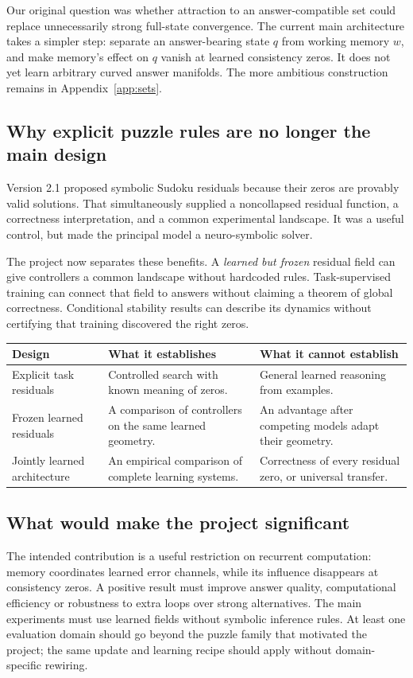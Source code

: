 \documentclass[11pt,a4paper]{article}
\begin{document}
Our original question was whether attraction to an answer-compatible set could replace unnecessarily strong full-state convergence. The current main architecture takes a simpler step: separate an answer-bearing state $q$ from working memory $w$, and make memory's effect on $q$ vanish at learned consistency zeros. It does not yet learn arbitrary curved answer manifolds. The more ambitious construction remains in Appendix~\ref{app:sets}.

\subsection{Why explicit puzzle rules are no longer the main design}
Version 2.1 proposed symbolic Sudoku residuals because their zeros are provably valid solutions. That simultaneously supplied a noncollapsed residual function, a correctness interpretation, and a common experimental landscape. It was a useful control, but made the principal model a neuro-symbolic solver.

The project now separates these benefits. A \emph{learned but frozen} residual field can give controllers a common landscape without hardcoded rules. Task-supervised training can connect that field to answers without claiming a theorem of global correctness. Conditional stability results can describe its dynamics without certifying that training discovered the right zeros.

\begin{tabularx}{\linewidth}{@{}P{35mm}Y Y@{}}\toprule
Design & What it establishes & What it cannot establish\\\midrule
Explicit task residuals & Controlled search with known meaning of zeros. & General learned reasoning from examples.\\
Frozen learned residuals & A comparison of controllers on the same learned geometry. & An advantage after competing models adapt their geometry.\\
Jointly learned architecture & An empirical comparison of complete learning systems. & Correctness of every residual zero, or universal transfer.\\\bottomrule
\end{tabularx}

\subsection{What would make the project significant}
The intended contribution is a useful restriction on recurrent computation: memory coordinates learned error channels, while its influence disappears at consistency zeros. A positive result must improve answer quality, computational efficiency or robustness to extra loops over strong alternatives. The main experiments must use learned fields without symbolic inference rules. At least one evaluation domain should go beyond the puzzle family that motivated the project; the same update and learning recipe should apply without domain-specific rewiring.
\end{document}
